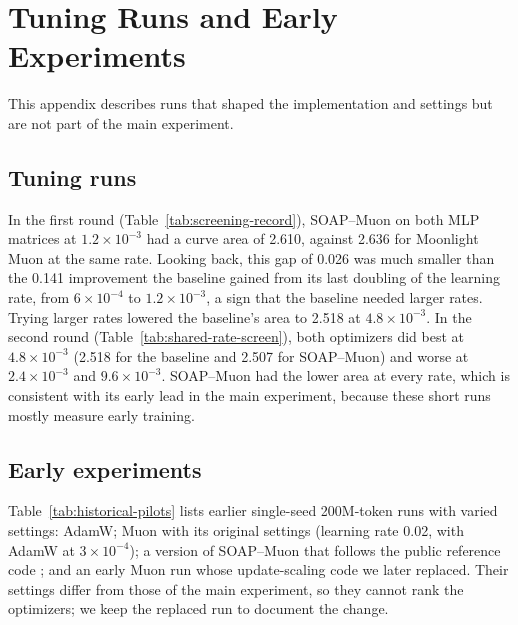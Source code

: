 \section{Tuning Runs and Early Experiments}
\label{app:exploratory}

This appendix describes runs that shaped the implementation and settings but
are not part of the main experiment.

\subsection*{Tuning runs}

In the first round (Table~\ref{tab:screening-record}), SOAP--Muon on both MLP
matrices at $1.2\times10^{-3}$ had a curve area of 2.610, against 2.636 for
Moonlight Muon at the same rate. Looking back, this gap of 0.026 was much
smaller than the 0.141 improvement the baseline gained from its last doubling
of the learning rate, from $6\times10^{-4}$ to $1.2\times10^{-3}$, a sign that
the baseline needed larger rates. Trying larger rates lowered the baseline's
area to 2.518 at $4.8\times10^{-3}$. In the second round
(Table~\ref{tab:shared-rate-screen}), both optimizers did best at
$4.8\times10^{-3}$ (2.518 for the baseline and 2.507 for SOAP--Muon) and worse
at $2.4\times10^{-3}$ and $9.6\times10^{-3}$. SOAP--Muon had the lower area at
every rate, which is consistent with its early lead in the main experiment,
because these short runs mostly measure early training.

\subsection*{Early experiments}

Table~\ref{tab:historical-pilots} lists earlier single-seed 200M-token runs with
varied settings: AdamW; Muon with its original settings (learning rate 0.02,
with AdamW at $3\times10^{-4}$); a version of SOAP--Muon that follows the public
reference code \cite{vyas_soapmuon_code}; and an early Muon run whose
update-scaling code we later replaced. Their settings differ from those of the
main experiment, so they cannot rank the optimizers; we keep the replaced run to
document the change.


